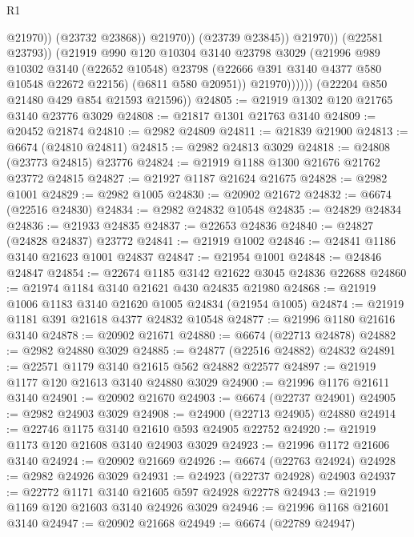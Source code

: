 \begin{lexlean}{R1}
\begin{coremodule}
                                  @21970))
                              (@23732 @23868))
                            @21970))
                        (@23739 @23845))
                      @21970))
                  (@22581 @23793))
                (@21919
                  @990
                  @120
                  @10304
                  @3140
                  @23798
                  @3029
                  (@21996
                    @989
                    @10302
                    @3140
                    (@22652 @10548)
                    @23798
                    (@22666 @391 @3140 @4377 @580 @10548 @22672 @22156)
                    (@6811 @580 @20951))
                  @21970))))))
      (@22204 @850 @21480 @429 @854 @21593 @21596))
@24805 := @21919 @1302 @120 @21765 @3140 @23776 @3029
@24808 := @21817 @1301 @21763 @3140
@24809 := @20452 @21874
@24810 := @2982 @24809
@24811 := @21839 @21900
@24813 := @6674 (@24810 @24811)
@24815 := @2982 @24813 @3029
@24818 := @24808 (@23773 @24815) @23776
@24824 := @21919 @1188 @1300 @21676 @21762 @23772 @24815
@24827 := @21927 @1187 @21624 @21675
@24828 := @2982 @1001
@24829 := @2982 @1005
@24830 := @20902 @21672
@24832 := @6674 (@22516 @24830)
@24834 := @2982 @24832 @10548
@24835 := @24829 @24834
@24836 := @21933 @24835
@24837 := @22653 @24836
@24840 := @24827 (@24828 @24837) @23772
@24841 := @21919 @1002
@24846 := @24841 @1186 @3140 @21623 @1001 @24837
@24847 := @21954 @1001
@24848 := @24846 @24847
@24854 := @22674 @1185 @3142 @21622 @3045 @24836 @22688
@24860 := @21974 @1184 @3140 @21621 @430 @24835 @21980
@24868 := @21919 @1006 @1183 @3140 @21620 @1005 @24834 (@21954 @1005)
@24874 := @21919 @1181 @391 @21618 @4377 @24832 @10548
@24877 := @21996 @1180 @21616 @3140
@24878 := @20902 @21671
@24880 := @6674 (@22713 @24878)
@24882 := @2982 @24880 @3029
@24885 := @24877 (@22516 @24882) @24832
@24891 := @22571 @1179 @3140 @21615 @562 @24882 @22577
@24897 := @21919 @1177 @120 @21613 @3140 @24880 @3029
@24900 := @21996 @1176 @21611 @3140
@24901 := @20902 @21670
@24903 := @6674 (@22737 @24901)
@24905 := @2982 @24903 @3029
@24908 := @24900 (@22713 @24905) @24880
@24914 := @22746 @1175 @3140 @21610 @593 @24905 @22752
@24920 := @21919 @1173 @120 @21608 @3140 @24903 @3029
@24923 := @21996 @1172 @21606 @3140
@24924 := @20902 @21669
@24926 := @6674 (@22763 @24924)
@24928 := @2982 @24926 @3029
@24931 := @24923 (@22737 @24928) @24903
@24937 := @22772 @1171 @3140 @21605 @597 @24928 @22778
@24943 := @21919 @1169 @120 @21603 @3140 @24926 @3029
@24946 := @21996 @1168 @21601 @3140
@24947 := @20902 @21668
@24949 := @6674 (@22789 @24947)

\end{coremodule}
\end{lexlean}
